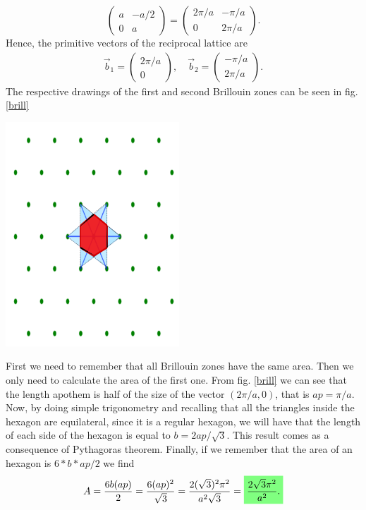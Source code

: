 \begin{questions}
\begin{solution}
\begin{equation}
\begin{pmatrix}
      a & -a/2\\
      0 & a
    \end{pmatrix} = \begin{pmatrix}
      2\pi/a & -\pi/a\\
      0 & 2\pi/a
    \end{pmatrix}.
  \end{equation}
  Hence, the primitive vectors of the reciprocal lattice are
  \begin{eqnarray}
    \vec{b}_1 =\begin{pmatrix}
      2\pi/a\\
      0
    \end{pmatrix}, \quad \vec{b}_2 = \begin{pmatrix}
       -\pi/a\\
       2\pi/a
    \end{pmatrix}.
  \end{eqnarray}
  The respective drawings of the first and second Brillouin zones can be seen in fig. \ref{brill}
  \begin{center}
    \includegraphics[width=65mm]{brill}
  \end{center}
  \label{brill}\vspace{0.5cm}
\end{solution}

\begin{solution}
  First we need to remember that all Brillouin zones have the same area. Then we only need to calculate the area of the first one. From fig. \ref{brill} we can see that the length apothem is half of the size of the vector $(2\pi/a, 0)$, that is $ap = \pi/a$. Now, by doing simple trigonometry and recalling that all the triangles inside the hexagon are equilateral, since it is a regular hexagon,   we will have that the length of each side of the hexagon is equal to $b=2ap/\sqrt{3}$. This result comes as a consequence of Pythagoras theorem. Finally, if we remember that the area of an hexagon is $6*b*ap/2$ we find
  \begin{equation}
    A = \frac{6b(ap)}{2} =  \frac{6(ap)^2}{\sqrt{3}} =  \frac{2(\sqrt{3})^2\pi^2}{a^2\sqrt{3}} = \hlgreen{\frac{2\sqrt{3}\pi^2}{a^2}.}
  \end{equation}
\end{solution}


\end{questions}
